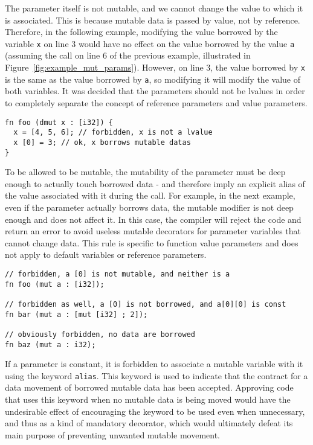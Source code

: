 

The parameter itself is not mutable, and we cannot change the value to which it
is associated. This is because mutable data is passed by value, not by
reference. Therefore, in the following example, modifying the value borrowed by
the variable \texttt{x} on line 3 would have no effect on the value borrowed by
the value \texttt{a} (assuming the call on line 6 of the previous example,
illustrated in Figure~\ref{fig:example_mut_params}). However, on line 3, the
value borrowed by \texttt{x} is the same as the value borrowed by \texttt{a}, so
modifying it will modify the value of both variables. It was decided that the
parameters should not be lvalues in order to completely separate the concept of
reference parameters and value parameters.

\begin{lstlisting}[style=coloredverbatim]
fn foo (dmut x : [i32]) {
  x = [4, 5, 6]; // forbidden, x is not a lvalue
  x [0] = 3; // ok, x borrows mutable datas
}
\end{lstlisting}

To be allowed to be mutable, the mutability of the parameter must be deep enough
to actually touch borrowed data - and therefore imply an explicit alias of the
value associated with it during the call. For example, in the next example, even
if the parameter actually borrows data, the mutable modifier is not deep enough
and does not affect it. In this case, the compiler will reject the code and
return an error to avoid useless mutable decorators for parameter variables that
cannot change data. This rule is specific to function value parameters and does
not apply to default variables or reference parameters.

\begin{lstlisting}[style=coloredverbatim]
// forbidden, a [0] is not mutable, and neither is a
fn foo (mut a : [i32]);

// forbidden as well, a [0] is not borrowed, and a[0][0] is const
fn bar (mut a : [mut [i32] ; 2]);

// obviously forbidden, no data are borrowed
fn baz (mut a : i32);
\end{lstlisting}


If a parameter is constant, it is forbidden to associate a mutable variable with
it using the keyword \texttt{alias}. This keyword is used to indicate that the
contract for a data movement of borrowed mutable data has been accepted.
Approving code that uses this keyword when no mutable data is being moved would
have the undesirable effect of encouraging the keyword to be used even when
unnecessary, and thus as a kind of mandatory decorator, which would ultimately
defeat its main purpose of preventing unwanted mutable movement.

